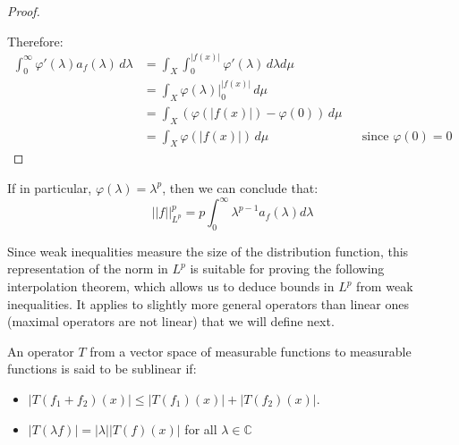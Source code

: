 \begin{proof}{}
\begin{center}
\begin{tikzpicture}[x=0.75pt,y=0.75pt,yscale=-1,xscale=1]
    \end{tikzpicture}  
  \end{center}
  Therefore:
  \begin{align*}
    \int_0^\infty \varphi'(\lambda)a_f(\lambda)\,d\lambda&=\int_X\int_0^{|f(x)|}\varphi'(\lambda)\,d\lambda d\mu\\
    &=\int_X\varphi(\lambda)|_0^{|f(x)|}\,d\mu\\
    &=\int_X(\varphi(|f(x)|)-\varphi(0))\,d\mu\\
    &=\int_X\varphi(|f(x)|)\,d\mu && \text{since } \varphi(0)=0
  \end{align*}
\end{proof}
\begin{note}{}
  If in particular, $\varphi(\lambda)=\lambda^p$, then we can conclude that:
  \begin{equation}
    ||f||_{L^p}^p=p\int_0^\infty \lambda^{p-1}a_f(\lambda)d\lambda 
  \end{equation}
\end{note}
Since weak inequalities measure the size of the distribution function, this representation of the norm in $L^p$ is suitable for proving the following interpolation theorem, which allows us to deduce bounds in $L^p$ from weak inequalities. It applies to slightly more general operators than linear ones (maximal operators are not linear) that we will define next.
\begin{definition}{}
  An operator $T$ from a vector space of measurable functions to measurable functions is said to be sublinear if:
  \begin{itemize}
    \item $|T(f_1+f_2)(x)|\leq |T(f_1)(x)|+|T(f_2)(x)|$.\\
    \item $|T(\lambda f)| = |\lambda||T(f)(x)|$ for all $\lambda\in\mathbb{C}$
  \end{itemize} 
\end{definition}
